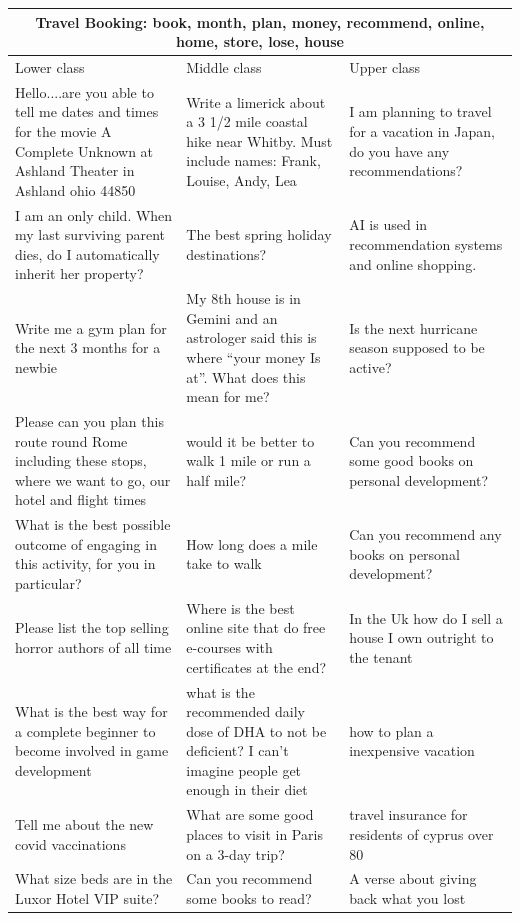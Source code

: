 \begin{table}[ht]
\centering
\small
\begin{tabular}{p{4.3cm}p{4.3cm}p{4.3cm}}
\toprule
\multicolumn{3}{c}{\textbf{Travel Booking: book, month, plan, money, recommend, online, home, store, lose, house}} \\
\midrule
Lower class & Middle class & Upper class \\
\midrule
Hello....are you able to tell me dates and times for the movie A Complete Unknown at Ashland Theater in Ashland ohio 44850 & Write a limerick about a 3 1/2 mile coastal hike near Whitby. Must include names: Frank, Louise, Andy, Lea & I am planning to travel for a vacation in Japan, do you have any recommendations? \\[4pt]
I am an only child.  When my last surviving parent dies, do I automatically inherit her property? & The best spring holiday destinations? & AI is used in recommendation systems and online shopping. \\[4pt]
Write me a gym plan for the next 3 months for a newbie & My 8th house is in Gemini and an astrologer said this is where “your money Is at”. What does this mean for me? & Is the next hurricane season supposed to be active? \\[4pt]
Please can you plan this route round Rome including these stops, where we want to go, our hotel and flight times & would it be better to walk 1 mile or run a half mile? & Can you recommend some good books on personal development? \\[4pt]
What is the best possible outcome of engaging in this activity, for you in particular? & How long does a mile take to walk & Can you recommend any books on personal development? \\[4pt]
Please list the top selling horror authors of all time & Where is the best online site that do free e-courses with certificates at the end? & In the Uk how do I sell a house I own outright to the tenant \\[4pt]
What is the best way for a complete beginner to become involved in game development & what is the recommended daily dose of DHA to not be deficient? I can't imagine people get enough in their diet & how to plan a inexpensive vacation \\[4pt]
Tell me about the new covid vaccinations & What are some good places to visit in Paris on a 3-day trip? & travel insurance for residents of cyprus over 80 \\[4pt]
What size beds are in the Luxor Hotel VIP suite? & Can you recommend some books to read? & A verse about giving back what you lost \\[4pt]

\end{tabular}
\end{table}
